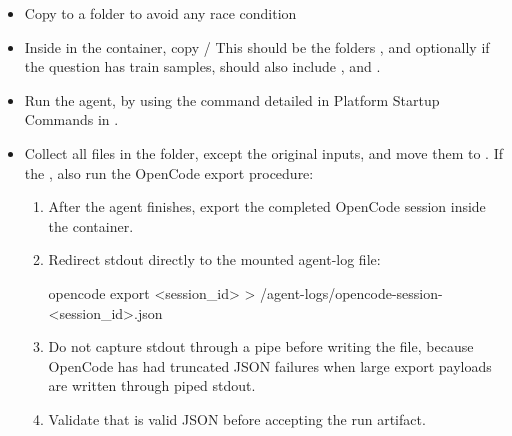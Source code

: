 \documentclass[11pt]{article}
\begin{document}
\begin{enumerate}
  \begin{itemize} 
    \item Copy  to a  folder to avoid any race condition
    \item Inside  in the container, copy /
    This should be the folders , and optionally if the question has train samples, should also include , and .
    \item Run the agent, by using the command detailed in Platform Startup Commands in .
    \item Collect all files in the  folder, except the original inputs, and move them to .
    If the , also run the OpenCode export procedure:
    \begin{enumerate}
      \item After the agent finishes, export the completed OpenCode session inside the container.
      \item Redirect stdout directly to the mounted agent-log file:
      \begin{DocCode}
opencode export <session_id> > /agent-logs/opencode-session-<session_id>.json
      \end{DocCode}
      \item Do not capture  stdout through a pipe before writing the file, because OpenCode has had truncated JSON failures when large export payloads are written through piped stdout.
      \item Validate that  is valid JSON before accepting the run artifact.
    \end{enumerate}


\end{itemize}
\end{enumerate}
\end{document}
